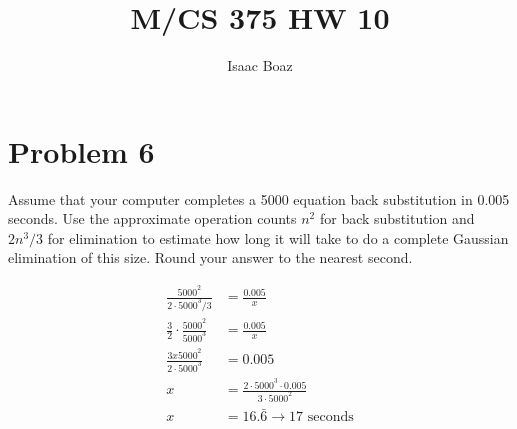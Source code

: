 \documentclass{article}
\title{\vspace{-5ex}M/CS 375 HW 10}
\author{Isaac Boaz}
\begin{document}
\maketitle

\section*{Problem 6}
Assume that your computer completes a 5000 equation back substitution in 0.005 seconds.
Use the approximate operation counts \(n^2\) for back substitution and \(2n^3/3\) for elimination to estimate how long it will take to do a complete Gaussian elimination of this size.
Round your answer to the nearest second.

\begin{align*}
    \frac{5000^2}{2\cdot5000^3/3} & = \frac{0.005}{x} \\ 
    \frac{3}{2} \cdot \frac{5000^2}{5000^3} & = \frac{0.005}{x} \\
    \frac{3x5000^2}{2\cdot5000^3} & =  0.005 \\
    x & = \frac{2\cdot5000^3\cdot0.005}{3\cdot5000^2} \\
    x & = 16. \bar{6} \rightarrow 17 \text{ seconds}
\end{align*}
\end{document}
